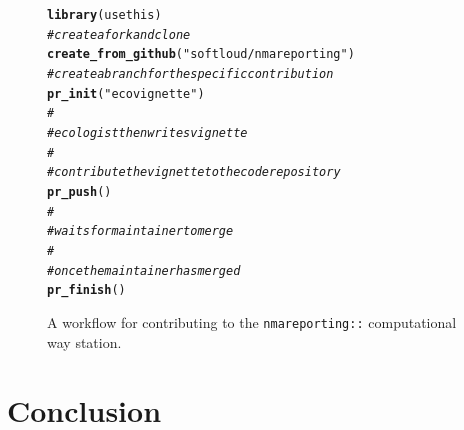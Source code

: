 \documentclass[12pt]{article}\usepackage[]{graphicx}\usepackage[]{color}
\makeatletter
\newcommand{\hlstr}[1]{\textcolor[rgb]{0.192,0.494,0.8}{#1}}%
\newcommand{\hlcom}[1]{\textcolor[rgb]{0.678,0.584,0.686}{\textit{#1}}}%
\newcommand{\hlstd}[1]{\textcolor[rgb]{0.345,0.345,0.345}{#1}}%
\newcommand{\hlkwd}[1]{\textcolor[rgb]{0.737,0.353,0.396}{\textbf{#1}}}%
\newenvironment{kframe}{%
 \def\at@end@of@kframe{}%
 \ifinner\ifhmode%
  \def\at@end@of@kframe{\end{minipage}}%
  \begin{minipage}{\columnwidth}%
 \fi\fi%
 \def\FrameCommand##1{\hskip\@totalleftmargin \hskip-\fboxsep
 \colorbox{shadecolor}{##1}\hskip-\fboxsep
     \hskip-\linewidth \hskip-\@totalleftmargin \hskip\columnwidth}%
 \MakeFramed {\advance\hsize-\width
   \@totalleftmargin\z@ \linewidth\hsize
   \@setminipage}}%
 {\par\unskip\endMakeFramed%
 \at@end@of@kframe}
\newenvironment{knitrout}{}{} %
\newcommand{\package}[1]{\texttt{{#1::}}}
\makeatother
\begin{document}
\begin{figure}

\begin{knitrout}
\color{fgcolor}\begin{kframe}
\begin{alltt}
\hlkwd{library}\hlstd{(usethis)}
\hlcom{# create a fork and clone}
\hlkwd{create_from_github}\hlstd{(}\hlstr{"softloud/nmareporting"}\hlstd{)}
\hlcom{# create a branch for the specific contribution}
\hlkwd{pr_init}\hlstd{(}\hlstr{"ecovignette"}\hlstd{)}
\hlcom{#}
\hlcom{# ecologist then writes vignette}
\hlcom{#}
\hlcom{# contribute the vignette to the code repository}
\hlkwd{pr_push}\hlstd{()}
\hlcom{#}
\hlcom{# waits for maintainer to merge}
\hlcom{#}
\hlcom{# once the maintainer has merged}
\hlkwd{pr_finish}\hlstd{()}
\end{alltt}
\end{kframe}
\end{knitrout}

\caption{A workflow for contributing to the \package{nmareporting} computational way station.}
\label{fig:workflow}
\end{figure}

\section{Conclusion}




\end{document}
